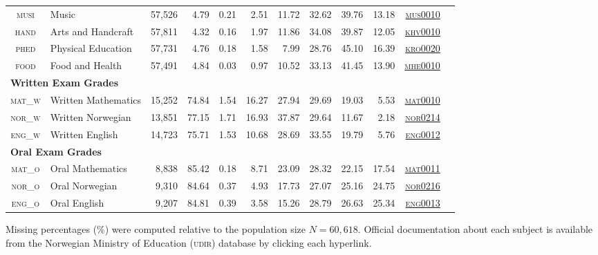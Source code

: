 {\begin{tabular}{clrrrrrrrrrl}
        \textsc{musi}  & Music & 57,526 & 4.79  & 0.21  & 2.51  & 11.72 & 32.62 & 39.76 & 13.18 & \href{https://www.udir.no/lk20/fagkoder/mus0010}{\textsc{mus0010}} \\
        \textsc{hand}  & Arts and Handcraft & 57,811 & 4.32  & 0.16  & 1.97  & 11.86 & 34.08 & 39.87 & 12.05 & \href{https://www.udir.no/lk20/fagkoder/khv0010}{\textsc{khv0010}} \\
        \textsc{phed}  & Physical Education & 57,731 & 4.76  & 0.18  & 1.58  & 7.99  & 28.76 & 45.10 & 16.39 & \href{https://www.udir.no/lk20/fagkoder/kro0020}{\textsc{kro0020}} \\
        \textsc{food}  & Food and Health & 57,491 & 4.84  & 0.03  & 0.97  & 10.52 & 33.13 & 41.45 & 13.90 & \href{https://www.udir.no/lk20/fagkoder/mhe0010}{\textsc{mhe0010}} \\
        \multicolumn{10}{l}{\textbf{Written Exam Grades}}                             &  \\
        \textsc{mat\_w} & Written Mathematics & 15,252 & 74.84 & 1.54  & 16.27 & 27.94 & 29.69 & 19.03 & 5.53  & \href{https://www.udir.no/lk20/fagkoder/mat0010}{\textsc{mat0010}} \\
        \textsc{nor\_w} & Written Norwegian & 13,851 & 77.15 & 1.71  & 16.93 & 37.87 & 29.64 & 11.67 & 2.18  & \href{https://www.udir.no/lk20/fagkoder/nor0214}{\textsc{nor0214}} \\
        \textsc{eng\_w} & Written English & 14,723 & 75.71 & 1.53  & 10.68 & 28.69 & 33.55 & 19.79 & 5.76  & \href{https://www.udir.no/lk20/fagkoder/eng0012}{\textsc{eng0012}} \\
        \multicolumn{10}{l}{\textbf{Oral Exam Grades}}                                &  \\
        \textsc{mat\_o} & Oral Mathematics & 8,838 & 85.42 & 0.18  & 8.71  & 23.09 & 28.32 & 22.15 & 17.54 & \href{https://www.udir.no/lk20/fagkoder/mat0011}{\textsc{mat0011}} \\
        \textsc{nor\_o} & Oral Norwegian & 9,310 & 84.64 & 0.37  & 4.93  & 17.73 & 27.07 & 25.16 & 24.75 & \href{https://www.udir.no/lk20/fagkoder/nor0216}{\textsc{nor0216}} \\
        \textsc{eng\_o} & Oral English & 9,207 & 84.81 & 0.39  & 3.58  & 15.26 & 28.79 & 26.63 & 25.34 & \href{https://www.udir.no/lk20/fagkoder/eng0013}{\textsc{eng0013}} \\
        \bottomrule
    \end{tabular}%
}{
    Missing percentages ($\%$) were computed relative to the population size $N = 60,618$. Official documentation about each subject is available from the Norwegian Ministry of Education (\textsc{udir}) database by clicking each hyperlink.
}
